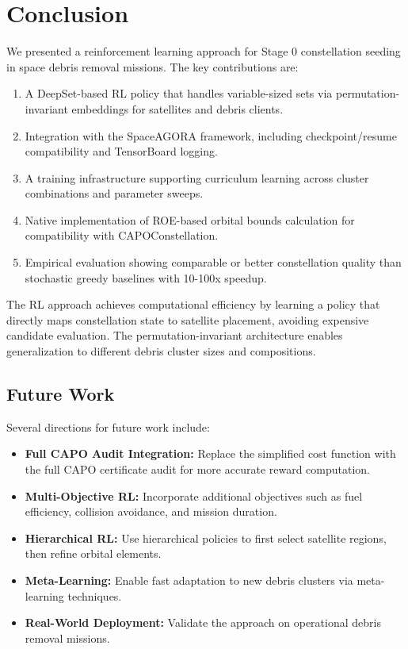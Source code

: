 \section{Conclusion}
\label{sec:conclusion}

We presented a reinforcement learning approach for Stage 0 constellation seeding in space debris removal missions. The key contributions are:

\begin{enumerate}
    \item A DeepSet-based RL policy that handles variable-sized sets via permutation-invariant embeddings for satellites and debris clients.
    \item Integration with the SpaceAGORA framework, including checkpoint/resume compatibility and TensorBoard logging.
    \item A training infrastructure supporting curriculum learning across cluster combinations and parameter sweeps.
    \item Native implementation of ROE-based orbital bounds calculation for compatibility with CAPOConstellation.
    \item Empirical evaluation showing comparable or better constellation quality than stochastic greedy baselines with 10-100x speedup.
\end{enumerate}

The RL approach achieves computational efficiency by learning a policy that directly maps constellation state to satellite placement, avoiding expensive candidate evaluation. The permutation-invariant architecture enables generalization to different debris cluster sizes and compositions.

\subsection{Future Work}

Several directions for future work include:

\begin{itemize}
    \item \textbf{Full CAPO Audit Integration:} Replace the simplified cost function with the full CAPO certificate audit for more accurate reward computation.
    \item \textbf{Multi-Objective RL:} Incorporate additional objectives such as fuel efficiency, collision avoidance, and mission duration.
    \item \textbf{Hierarchical RL:} Use hierarchical policies to first select satellite regions, then refine orbital elements.
    \item \textbf{Meta-Learning:} Enable fast adaptation to new debris clusters via meta-learning techniques.
    \item \textbf{Real-World Deployment:} Validate the approach on operational debris removal missions.
\end{itemize}

